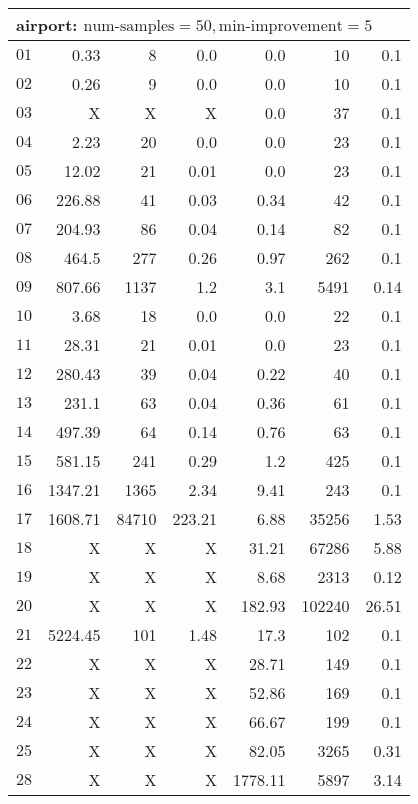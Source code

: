 \begin{longtable}{|c||r|r|r||r|r|r|}
\multicolumn{7}{|l|}{airport: $\text{num-samples}=50,\text{min-improvement}=5$}\\\hline
$01$ & 0.33 & 8 & 0.0 & 0.0 & 10 & 0.1 \\\hline
$02$ & 0.26 & 9 & 0.0 & 0.0 & 10 & 0.1 \\\hline
$03$ &  X &  X &  X & 0.0 & 37 & 0.1 \\\hline
$04$ & 2.23 & 20 & 0.0 & 0.0 & 23 & 0.1 \\\hline
$05$ & 12.02 & 21 & 0.01 & 0.0 & 23 & 0.1 \\\hline
$06$ & 226.88 & 41 & 0.03 & 0.34 & 42 & 0.1 \\\hline
$07$ & 204.93 & 86 & 0.04 & 0.14 & 82 & 0.1 \\\hline
$08$ & 464.5 & 277 & 0.26 & 0.97 & 262 & 0.1 \\\hline
$09$ & 807.66 & 1137 & 1.2 & 3.1 & 5491 & 0.14 \\\hline
$10$ & 3.68 & 18 & 0.0 & 0.0 & 22 & 0.1 \\\hline
$11$ & 28.31 & 21 & 0.01 & 0.0 & 23 & 0.1 \\\hline
$12$ & 280.43 & 39 & 0.04 & 0.22 & 40 & 0.1 \\\hline
$13$ & 231.1 & 63 & 0.04 & 0.36 & 61 & 0.1 \\\hline
$14$ & 497.39 & 64 & 0.14 & 0.76 & 63 & 0.1 \\\hline
$15$ & 581.15 & 241 & 0.29 & 1.2 & 425 & 0.1 \\\hline
$16$ & 1347.21 & 1365 & 2.34 & 9.41 & 243 & 0.1 \\\hline
$17$ & 1608.71 & 84710 & 223.21 & 6.88 & 35256 & 1.53 \\\hline
$18$ &  X &  X &  X & 31.21 & 67286 & 5.88 \\\hline
$19$ &  X &  X &  X & 8.68 & 2313 & 0.12 \\\hline
$20$ &  X &  X &  X & 182.93 & 102240 & 26.51 \\\hline
$21$ & 5224.45 & 101 & 1.48 & 17.3 & 102 & 0.1 \\\hline
$22$ &  X &  X &  X & 28.71 & 149 & 0.1 \\\hline
$23$ &  X &  X &  X & 52.86 & 169 & 0.1 \\\hline
$24$ &  X &  X &  X & 66.67 & 199 & 0.1 \\\hline
$25$ &  X &  X &  X & 82.05 & 3265 & 0.31 \\\hline
$28$ &  X &  X &  X & 1778.11 & 5897 & 3.14 \\\hline

\end{longtable}
